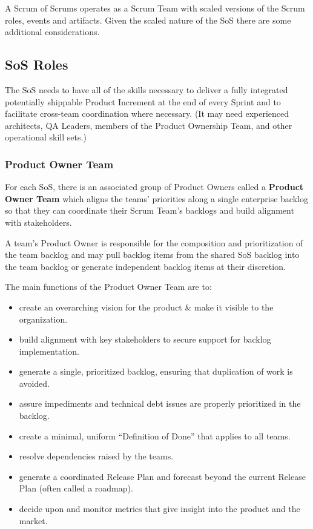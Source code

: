 \documentclass[12pt,a4paper,parskip=full]{scrartcl}
\begin{document}
A Scrum of Scrums operates as a Scrum Team with scaled versions of the Scrum roles, events and artifacts. Given the scaled nature of the SoS there are some additional considerations.

\subsection{SoS Roles}

The SoS needs to have all of the skills necessary to deliver a fully integrated potentially shippable Product Increment at the end of every Sprint and to facilitate cross-team coordination where necessary. (It may need experienced architects, QA Leaders, members of the Product Ownership Team, and other operational skill sets.) 

\subsubsection{Product Owner Team}

For each SoS, there is an associated group of Product Owners called a \textbf{Product Owner Team} which aligns the teams' priorities along a single enterprise backlog so that they can coordinate their Scrum Team's backlogs and build alignment with stakeholders.

A team's Product Owner is responsible for the composition and prioritization of the team backlog and may pull backlog items from the shared SoS backlog into the team backlog or generate independent backlog items at their discretion.

The main functions of the Product Owner Team are to:

\begin{itemize}
	\item create an overarching vision for the product \& make it visible to the organization.
	\item build alignment with key stakeholders to secure support for backlog implementation.
	\item generate a single, prioritized backlog, ensuring that duplication of work is avoided.
	\item assure impediments and technical debt issues are properly prioritized in the backlog.
	\item create a minimal, uniform ``Definition of Done'' that applies to all teams.
	\item resolve dependencies raised by the teams.
	\item generate a coordinated Release Plan and forecast beyond the current Release Plan (often called a roadmap).
	\item decide upon and monitor metrics that give insight into the product and the market.
\end{itemize}
\end{document}
